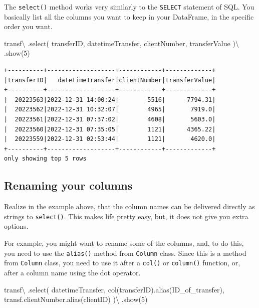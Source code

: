 \documentclass[
  11pt,
  letterpaper,
  DIV=11,
  numbers=noendperiod]{scrreprt}
\newenvironment{Shaded}{\begin{snugshade}}{\end{snugshade}}
\newcommand{\DecValTok}[1]{\textcolor[rgb]{0.68,0.00,0.00}{#1}}
\newcommand{\NormalTok}[1]{\textcolor[rgb]{0.00,0.23,0.31}{#1}}
\newcommand{\OperatorTok}[1]{\textcolor[rgb]{0.37,0.37,0.37}{#1}}
\newcommand{\StringTok}[1]{\textcolor[rgb]{0.13,0.47,0.30}{#1}}
\begin{document}
The \texttt{select()} method works very similarly to the \texttt{SELECT}
statement of SQL. You basically list all the columns you want to keep in
your DataFrame, in the specific order you want.

\begin{Shaded}
\begin{Highlighting}[]
\NormalTok{transf}\OperatorTok{\textbackslash{}}
\NormalTok{  .select(}
    \StringTok{\textquotesingle{}transferID\textquotesingle{}}\NormalTok{, }\StringTok{\textquotesingle{}datetimeTransfer\textquotesingle{}}\NormalTok{,}
    \StringTok{\textquotesingle{}clientNumber\textquotesingle{}}\NormalTok{, }\StringTok{\textquotesingle{}transferValue\textquotesingle{}}
\NormalTok{  )}\OperatorTok{\textbackslash{}}
\NormalTok{  .show(}\DecValTok{5}\NormalTok{)}
\end{Highlighting}
\end{Shaded}

\begin{verbatim}
+----------+-------------------+------------+-------------+
|transferID|   datetimeTransfer|clientNumber|transferValue|
+----------+-------------------+------------+-------------+
|  20223563|2022-12-31 14:00:24|        5516|      7794.31|
|  20223562|2022-12-31 10:32:07|        4965|       7919.0|
|  20223561|2022-12-31 07:37:02|        4608|       5603.0|
|  20223560|2022-12-31 07:35:05|        1121|      4365.22|
|  20223559|2022-12-31 02:53:44|        1121|       4620.0|
+----------+-------------------+------------+-------------+
only showing top 5 rows
\end{verbatim}

\hypertarget{renaming-your-columns}{%
\subsection{Renaming your columns}\label{renaming-your-columns}}

Realize in the example above, that the column names can be delivered
directly as strings to \texttt{select()}. This makes life pretty easy,
but, it does not give you extra options.

For example, you might want to rename some of the columns, and, to do
this, you need to use the \texttt{alias()} method from \texttt{Column}
class. Since this is a method from \texttt{Column} class, you need to
use it after a \texttt{col()} or \texttt{column()} function, or, after a
column name using the dot operator.

\begin{Shaded}
\begin{Highlighting}[]
\NormalTok{transf}\OperatorTok{\textbackslash{}}
\NormalTok{  .select(}
    \StringTok{\textquotesingle{}datetimeTransfer\textquotesingle{}}\NormalTok{,}
\NormalTok{    col(}\StringTok{\textquotesingle{}transferID\textquotesingle{}}\NormalTok{).alias(}\StringTok{\textquotesingle{}ID\_of\_transfer\textquotesingle{}}\NormalTok{),}
\NormalTok{    transf.clientNumber.alias(}\StringTok{\textquotesingle{}clientID\textquotesingle{}}\NormalTok{)}
\NormalTok{  )}\OperatorTok{\textbackslash{}}
\NormalTok{  .show(}\DecValTok{5}\NormalTok{)}
\end{Highlighting}
\end{Shaded}
\end{document}
